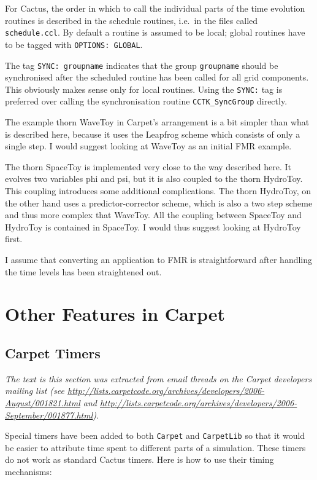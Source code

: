 For Cactus, the order in which to call the individual parts of the
time evolution routines is described in the schedule routines, i.e.\
in the files called \texttt{schedule.ccl}.  By default a routine is
assumed to be local; global routines have to be tagged with
\texttt{OPTIONS: GLOBAL}.

The tag \texttt{SYNC: groupname} indicates that the group
\texttt{groupname} should be synchronised after the scheduled routine
has been called for all grid components.  This obviously makes sense
only for local routines.  Using the \texttt{SYNC:} tag is preferred
over calling the synchronisation routine \texttt{CCTK\_SyncGroup}
directly.

The example thorn WaveToy in Carpet's arrangement is a bit simpler
than what is described here, because it uses the Leapfrog scheme which
consists of only a single step.  I would suggest looking at WaveToy as
an initial FMR example.

The thorn SpaceToy is implemented very close to the way described
here.  It evolves two variables phi and psi, but it is also coupled to
the thorn HydroToy.  This coupling introduces some additional
complications.  The thorn HydroToy, on the other hand uses a
predictor-corrector scheme, which is also a two step scheme and thus
more complex that WaveToy.  All the coupling between SpaceToy and
HydroToy is contained in SpaceToy.  I would thus suggest looking at
HydroToy first.

I assume that converting an application to FMR is straightforward
after handling the time levels has been straightened out.



\section{Other Features in Carpet}

\subsection{Carpet Timers}

{\it The text is this section was extracted from email threads on the
Carpet developers mailing list (see \url{http://lists.carpetcode.org/archives/developers/2006-August/001821.html} and \url{http://lists.carpetcode.org/archives/developers/2006-September/001877.html})}.

Special timers have been added to both {\tt Carpet} and {\tt CarpetLib} so
that it would be easier to attribute time spent to different parts of
a simulation.  These timers do not work as standard Cactus timers.
Here is how to use their timing mechanisms:

